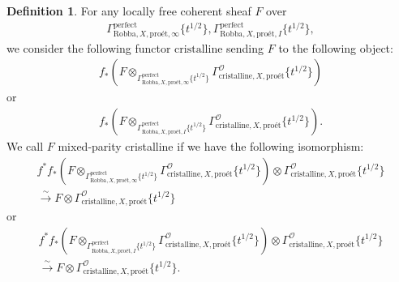 \documentclass[12pt]{book}
\theoremstyle{definition}
\newtheorem{definition}{Definition}
\begin{document}
\begin{definition}
For any locally free coherent sheaf $F$ over
\begin{align}
\Gamma^\mathrm{perfect}_{\text{Robba},X,\text{pro\'et},\infty}\{t^{1/2}\},\Gamma^\mathrm{perfect}_{\text{Robba},X,\text{pro\'et},I}\{t^{1/2}\},
\end{align} 
we consider the following functor $\mathrm{cristalline}$ sending $F$ to the following object:
\begin{align}
f_*(F\otimes_{\Gamma^\mathrm{perfect}_{\text{Robba},X,\text{pro\'et},\infty}\{t^{1/2}\}} \Gamma^\mathcal{O}_{\text{cristalline},X,\text{pro\'et}}\{t^{1/2}\})
\end{align}
or 
\begin{align}
f_*(F\otimes_{\Gamma^\mathrm{perfect}_{\text{Robba},X,\text{pro\'et},I}\{t^{1/2}\}} \Gamma^\mathcal{O}_{\text{cristalline},X,\text{pro\'et}}\{t^{1/2}\}).
\end{align}
We call $F$ mixed-parity cristalline if we have the following isomorphism:
\begin{align}
f^*f_*(F\otimes_{\Gamma^\mathrm{perfect}_{\text{Robba},X,\text{pro\'et},\infty}\{t^{1/2}\}} \Gamma^\mathcal{O}_{\text{cristalline},X,\text{pro\'et}}\{t^{1/2}\}) \otimes \Gamma^\mathcal{O}_{\text{cristalline},X,\text{pro\'et}}\{t^{1/2}\}\\ \overset{\sim}{\longrightarrow} F \otimes \Gamma^\mathcal{O}_{\text{cristalline},X,\text{pro\'et}}\{t^{1/2}\} 
\end{align}
or 
\begin{align}
f^*f_*(F\otimes_{\Gamma^\mathrm{perfect}_{\text{Robba},X,\text{pro\'et},I}\{t^{1/2}\}} \Gamma^\mathcal{O}_{\text{cristalline},X,\text{pro\'et}}\{t^{1/2}\}) \otimes \Gamma^\mathcal{O}_{\text{cristalline},X,\text{pro\'et}}\{t^{1/2}\} \\\overset{\sim}{\longrightarrow} F \otimes \Gamma^\mathcal{O}_{\text{cristalline},X,\text{pro\'et}}\{t^{1/2}\}. 
\end{align}
\end{definition}
\end{document}
